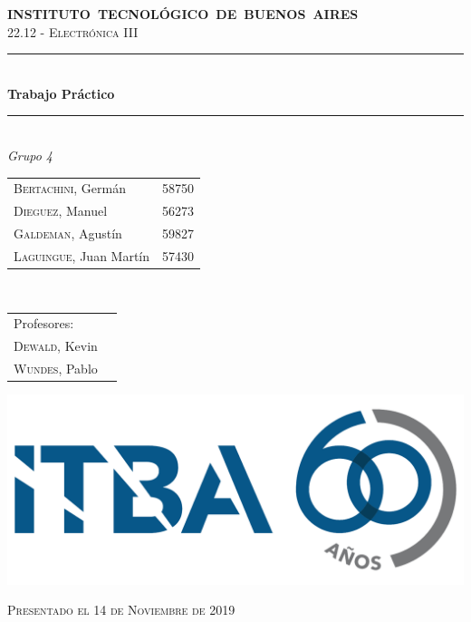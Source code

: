 \begin{titlepage}
    \newcommand{\HRule}{\rule{\linewidth}{0.5mm}}
    \begin{center}
	    \mbox{\textsc{\large \bfseries {INSTITUTO TECNOL\'OGICO DE BUENOS AIRES}}} \\[1cm]
	    \textsc{\Large 22.12 - Electr\'onica III} \\[0.5cm]    
	    \HRule \\[0.6cm]
	    { 	\Huge \bfseries Trabajo Pr\'actico 	} \\[0.4cm] 
	    \HRule \\[1.5cm]
	    \large
	    \emph{\Large Grupo 4}\\
	    \vspace{10px}
	   
	    \begin{tabular}{lr}
	    \textsc{Bertachini}, Germ\'an  & 58750 \\ 	
	    \textsc{Dieguez}, Manuel  & 56273 \\
	    \textsc{Galdeman}, Agust\'in  & 59827 \\
	    \textsc{Laguingue}, Juan Mart\'in  & 57430 \\
	    \end{tabular} \\
	    \vspace{20px}
	    \begin{tabular}{lr}
	    \textsc{}Profesores:\\
	    \textsc{Dewald}, Kevin\\
	    \textsc{Wundes}, Pablo\\
	    \end{tabular}
	    \vspace{60px}
	
		\includegraphics[scale=0.20]{Extras/ITBA.png}    
		\vspace{30px}
	    
	    \textsc{\large Presentado el 14 de Noviembre de 2019}\\
    \end{center}
\end{titlepage}
